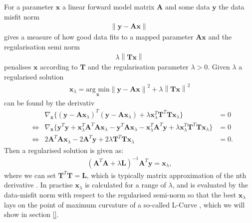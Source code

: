 For a parameter $\bm{x}$ a linear forward model matrix $\bm{A}$ and some data $\bm{y}$ the data misfit norm
\begin{align}
	\left\lVert \bm{y} - \bm{A}\bm{x} \right\rVert \, 
\end{align}
gives a measure of how good data fits to a mapped parameter $\bm{Ax}$ and the regularisation semi norm 
\begin{align}
	\lambda \left\lVert \bm{T}\bm{x}  \right\rVert
\end{align}
penalises $\bm{x}$ according to $\bm{T}$ and the regularisation parameter $\lambda > 0$.
Given $\lambda$ a regularised solution
\begin{align}
	\bm{x}_{\lambda} = \underset{\bm{x}}{\text{arg min}} \left\lVert \bm{y} - \bm{A}\bm{x}  \right\rVert^2 + \lambda \left\lVert \bm{T}\bm{x} \right\rVert^2
\end{align}
can be found by the derivativ
\begin{align}
&  &\nabla_{\bm{x}} \big\{  (\bm{y} - \bm{A}\bm{x}_{\lambda} )^T  (\bm{y} - \bm{A}\bm{x}_{\lambda})  + \lambda \bm{x}_{\lambda}^T  \bm{T}^T \bm{T} \bm{x}_{\lambda} \big\} &= 0 \\
&\iff &\nabla_{\bm{x}} \big\{ \bm{y}^T \bm{y} + \bm{x}_{\lambda}^T \bm{A}^T  \bm{A}\bm{x}_{\lambda} - \bm{y}^T \bm{A}\bm{x}_{\lambda} - \bm{x}_{\lambda}^T \bm{A}^T   \bm{y}   + \lambda \bm{x}_{\lambda}^T  \bm{T}^T \bm{T} \bm{x}_{\lambda} \big\} & = 0  \\
& \iff& 2\bm{A}^T  \bm{A}\bm{x}_{\lambda} -2 \bm{A}^T   \bm{y}  + 2 \lambda   \bm{T}^T \bm{T} \bm{x}_{\lambda}  & = 0.
\end{align}
Then a regularised solution is given as:
\begin{align}
	(\bm{A}^T  \bm{A} + \lambda   \bm{L} )^{-1} \bm{A}^T   \bm{y}   = \bm{x}_{\lambda}, 
\end{align}
where we can set $\bm{T}^T \bm{T} = \bm{L}$, which is typically matrix approximation of the nth derivative \cite{tan2016LecNot}.
In practise $\bm{x}_{\lambda}$ is calculated for a range of $\lambda$, and is evaluated by the data-misfit norm with respect to the regularised semi-norm so that the best $\bm{x}_{\lambda}$ lays on the point of maximum curvature of a so-called L-Curve \cite{hansen1993use}, which we will show in section \ref{}.



